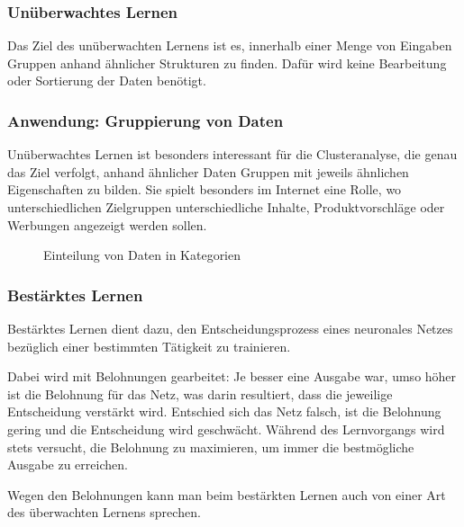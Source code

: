 \documentclass[12pt,a4]{article}
\begin{document}
\subsubsection{Unüberwachtes Lernen}
Das Ziel des unüberwachten Lernens ist es, innerhalb einer Menge von Eingaben Gruppen anhand ähnlicher Strukturen zu finden. Dafür wird keine Bearbeitung oder Sortierung der Daten benötigt.

\subsubsection*{Anwendung: Gruppierung von Daten}
Unüberwachtes Lernen ist besonders interessant für die Clusteranalyse, die genau das Ziel verfolgt, anhand ähnlicher Daten Gruppen mit jeweils ähnlichen Eigenschaften zu bilden. Sie spielt besonders im Internet eine Rolle, wo unterschiedlichen Zielgruppen unterschiedliche Inhalte, Produktvorschläge oder Werbungen angezeigt werden sollen.

\begin{figure}[!h]
\centering
{}
\caption{Einteilung von Daten in Kategorien}
\end{figure}

\subsubsection{Bestärktes Lernen}
Bestärktes Lernen dient dazu, den Entscheidungsprozess eines neuronales Netzes bezüglich einer bestimmten Tätigkeit zu trainieren.

Dabei wird mit Belohnungen gearbeitet: Je besser eine Ausgabe war, umso höher ist die Belohnung für das Netz, was darin resultiert, dass die jeweilige Entscheidung verstärkt wird. Entschied sich das Netz falsch, ist die Belohnung gering und die Entscheidung wird geschwächt. Während des Lernvorgangs wird stets versucht, die Belohnung zu maximieren, um immer die bestmögliche Ausgabe zu erreichen.

Wegen den Belohnungen kann man beim bestärkten Lernen auch von einer Art des überwachten Lernens sprechen.
\end{document}
